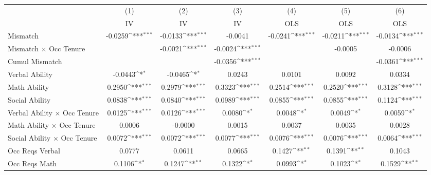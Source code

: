 {
\def\sym#1{\ifmmode^{#1}\else\(^{#1}\)\fi}
\begin{tabular}{l*{6}{c}}
\hline  
                    &\multicolumn{1}{c}{(1)}&\multicolumn{1}{c}{(2)}&\multicolumn{1}{c}{(3)}&\multicolumn{1}{c}{(4)}&\multicolumn{1}{c}{(5)}&\multicolumn{1}{c}{(6)}\\
                    &\multicolumn{1}{c}{IV}&\multicolumn{1}{c}{IV}&\multicolumn{1}{c}{IV}&\multicolumn{1}{c}{OLS}&\multicolumn{1}{c}{OLS}&\multicolumn{1}{c}{OLS}\\
\hline  
Mismatch            &     -0.0259\sym{***}&     -0.0133\sym{***}&     -0.0041         &     -0.0241\sym{***}&     -0.0211\sym{***}&     -0.0134\sym{***}\\
[1em]
Mismatch $\times$ Occ Tenure&                     &     -0.0021\sym{***}&     -0.0024\sym{***}&                     &     -0.0005         &     -0.0006         \\
[1em]
Cumul Mismatch      &                     &                     &     -0.0356\sym{***}&                     &                     &     -0.0361\sym{***}\\
[1em]
Verbal Ability      &     -0.0443\sym{*}  &     -0.0465\sym{*}  &      0.0243         &      0.0101         &      0.0092         &      0.0334         \\
[1em]
Math Ability        &      0.2950\sym{***}&      0.2979\sym{***}&      0.3323\sym{***}&      0.2514\sym{***}&      0.2520\sym{***}&      0.3128\sym{***}\\
[1em]
Social Ability      &      0.0838\sym{***}&      0.0840\sym{***}&      0.0989\sym{***}&      0.0855\sym{***}&      0.0855\sym{***}&      0.1124\sym{***}\\
[1em]
Verbal Ability $\times$ Occ Tenure&      0.0125\sym{***}&      0.0126\sym{***}&      0.0080\sym{*}  &      0.0048\sym{*}  &      0.0049\sym{*}  &      0.0059\sym{*}  \\
[1em]
Math Ability $\times$ Occ Tenure&      0.0006         &     -0.0000         &      0.0015         &      0.0037         &      0.0035         &      0.0028         \\
[1em]
Social Ability $\times$ Occ Tenure&      0.0072\sym{***}&      0.0072\sym{***}&      0.0077\sym{***}&      0.0076\sym{***}&      0.0076\sym{***}&      0.0064\sym{***}\\
[1em]
Occ Reqs Verbal     &      0.0777         &      0.0611         &      0.0665         &      0.1427\sym{**} &      0.1391\sym{**} &      0.1043         \\
[1em]
Occ Reqs Math       &      0.1106\sym{*}  &      0.1247\sym{**} &      0.1322\sym{*}  &      0.0993\sym{*}  &      0.1023\sym{*}  &      0.1529\sym{**} \\

\end{tabular}}
